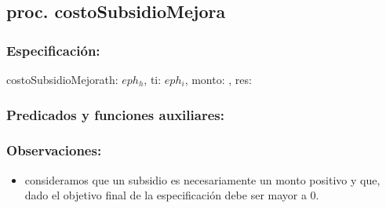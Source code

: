 \subsection{proc. costoSubsidioMejora}

    \subsubsection{Especificaci\'on:}    
        \begin{proc}{costoSubsidioMejora}{\In th: $eph_{h}$, \In ti: $eph_{i}$, \In monto: \ent, \Out res: \ent}{}
        \end{proc}

    \subsubsection{Predicados y funciones auxiliares:}
        \noindent{}

    \subsubsection{Observaciones:}
        \begin{itemize}
            \item consideramos que un subsidio es necesariamente un monto positivo y que, dado el objetivo final de la especificaci\'on
            debe ser mayor a 0.
        \end{itemize}
